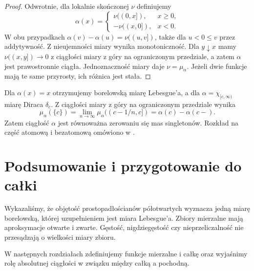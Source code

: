 \begin{proof}
Odwrotnie, dla lokalnie skończonej $\nu$ definiujemy
\[
 \alpha(x)=
 \begin{cases}
 \nu((0,x]),&x\ge0,\\
 -\nu((x,0]),&x<0.
 \end{cases}
\]
W obu przypadkach $\alpha(v)-\alpha(u)=\nu((u,v])$, także dla $u<0\le v$ przez addytywność. Z nieujemności miary wynika monotoniczność. Dla $y\downarrow x$ mamy $\nu((x,y])\to0$ z ciągłości miary z góry na ograniczonym przedziale, a zatem $\alpha$ jest prawostronnie ciągła. Jednoznaczność miary daje $\nu=\mu_\alpha$. Jeżeli dwie funkcje mają te same przyrosty, ich różnica jest stała.
\end{proof}

Dla $\alpha(x)=x$ otrzymujemy borelowską miarę Lebesgue'a,
a dla $\alpha=\chi_{[c,\infty)}$ miarę Diraca $\delta_c$.
Z ciągłości miary z góry na ograniczonym przedziale wynika
\[
 \mu_\alpha(\{c\})=\lim_{n\to\infty}\mu_\alpha((c-1/n,c])
 =\alpha(c)-\alpha(c-).
\]
Zatem ciągłość $\alpha$ jest równoważna zerowaniu się mas
singletonów. Rozkład na część atomową i bezatomową
omówiono w .

\section{Podsumowanie i przygotowanie do całki}

Wykazaliśmy, że objętość prostopadłościanów
półotwartych wyznacza jedną miarę borelowską,
której uzupełnieniem jest miara Lebesgue'a. Zbiory
mierzalne mają aproksymacje otwarte i zwarte.
Gęstość, nigdziegęstość czy nieprzeliczalność
nie przesądzają o wielkości miary zbioru.

W następnych rozdziałach zdefiniujemy funkcje
mierzalne i całkę oraz wyjaśnimy rolę absolutnej
ciągłości w związku między całką a pochodną.
